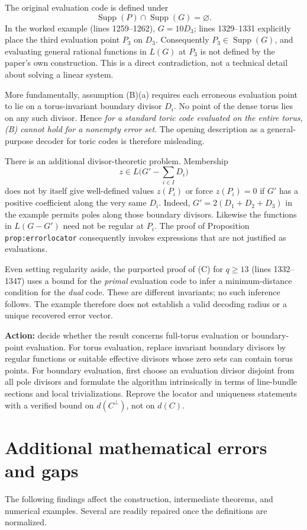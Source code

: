 \documentclass[12pt,letterpaper]{article}
\DeclareMathOperator{\Supp}{Supp}
\begin{document}
The original evaluation code is defined under
\[
\Supp(P)\cap\Supp(G)=\varnothing.
\]
In the worked example (lines 1259--1262), $G=10D_3$; lines 1329--1331 explicitly place the third evaluation point $P_3$ on $D_3$.  Consequently $P_3\in\Supp(G)$, and evaluating general rational functions in $L(G)$ at $P_3$ is not defined by the paper's own construction.  This is a direct contradiction, not a technical detail about solving a linear system.

More fundamentally, assumption (B)(a) requires each erroneous evaluation point to lie on a torus-invariant boundary divisor $D_i$.  No point of the dense torus lies on any such divisor.  Hence \emph{for a standard toric code evaluated on the entire torus, (B) cannot hold for a nonempty error set}.  The opening description as a general-purpose decoder for toric codes is therefore misleading.

There is an additional divisor-theoretic problem.  Membership
\[
z\in L\bigl(G'-\textstyle\sum_{i\in I}D_i\bigr)
\]
does not by itself give well-defined values $z(P_i)$ or force $z(P_i)=0$ if $G'$ has a positive coefficient along the very same $D_i$.  Indeed, $G'=2(D_1+D_2+D_3)$ in the example permits poles along those boundary divisors.  Likewise the functions in $L(G-G')$ need not be regular at $P_i$.  The proof of Proposition \texttt{prop:errorlocator} consequently invokes expressions that are not justified as evaluations.

Even setting regularity aside, the purported proof of (C) for $q\ge13$ (lines 1332--1347) uses a bound for the \emph{primal} evaluation code to infer a minimum-distance condition for the \emph{dual} code.  These are different invariants; no such inference follows.  The example therefore does not establish a valid decoding radius or a unique recovered error vector.

\textbf{Action:} decide whether the result concerns full-torus evaluation or boundary-point evaluation.  For torus evaluation, replace invariant boundary divisors by regular functions or suitable effective divisors whose zero sets can contain torus points.  For boundary evaluation, first choose an evaluation divisor disjoint from all pole divisors and formulate the algorithm intrinsically in terms of line-bundle sections and local trivializations.  Reprove the locator and uniqueness statements with a verified bound on $d(C^\perp)$, not on $d(C)$.

\section{Additional mathematical errors and gaps}\label{sec:additional}
The following findings affect the construction, intermediate theorems, and numerical examples.  Several are readily repaired once the definitions are normalized.
\end{document}
